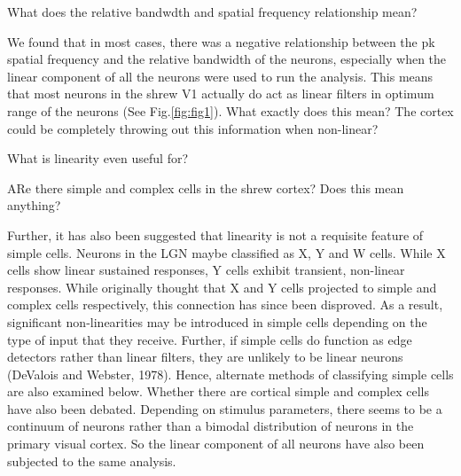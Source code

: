 What does the relative bandwdth and spatial frequency relationship mean?

We found that in most cases, there was a negative relationship between the pk spatial frequency and the relative bandwidth of the neurons, especially when the linear component of all the neurons were used to run the analysis. This means that most neurons in the shrew V1 actually do act as linear filters in optimum range of the neurons (See Fig.\ref{fig:fig1}).
What exactly does this mean? The cortex could be completely throwing out this information when non-linear?

What is linearity even useful for?

ARe there simple and complex cells in the shrew cortex? Does this mean anything?


Further, it has also been suggested that linearity is not a requisite feature of simple cells. Neurons in the LGN maybe classified as X, Y and W cells. While X cells show linear sustained responses, Y cells exhibit transient, non-linear responses. While originally thought that X and Y cells projected to simple and complex cells respectively, this connection has since been disproved. As a result, significant non-linearities may be introduced in simple cells depending on the type of input that they receive. Further, if simple cells do function as edge detectors rather than linear filters, they are unlikely to be linear neurons (DeValois and Webster, 1978). Hence, alternate methods of classifying simple cells are also examined below. 
Whether there are cortical simple and complex cells have also been debated. Depending on stimulus parameters, there seems to be a continuum of neurons rather than a bimodal distribution of neurons in the primary visual cortex. So the linear component of all neurons have also been subjected to the same analysis.